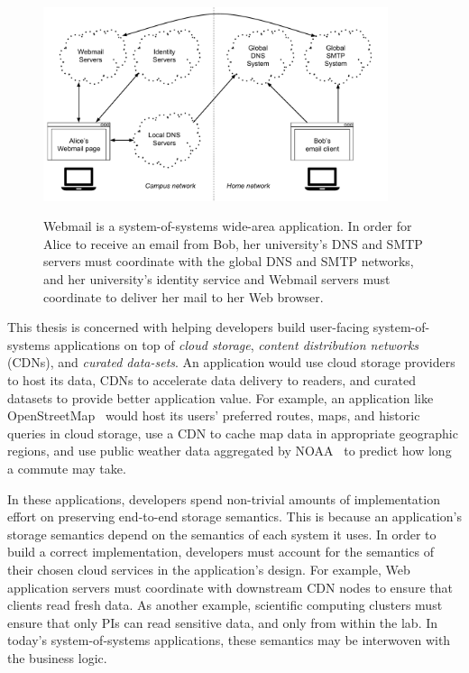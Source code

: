 \begin{figure}[h]
   \caption{Webmail is a system-of-systems wide-area application.  In order for
   Alice to receive an email from Bob, her university's DNS and SMTP servers
   must coordinate with the global DNS and SMTP networks, and her university's
   identity service and Webmail servers must coordinate to deliver her mail to
   her Web browser.}
   \centering
   \includegraphics[width=0.9\textwidth,page=1]{figures/dissertation-figures}
   \label{fig:chap1-system-of-systems}
\end{figure}

This thesis is concerned with helping developers build user-facing
system-of-systems applications on top of \emph{cloud storage},
\emph{content distribution networks} (CDNs), and \emph{curated data-sets}.
An application would use cloud storage providers to host
its data, CDNs to accelerate data delivery to readers,
and curated datasets to provide better application value.
For example, an application like OpenStreetMap~\cite{openstreetmap}
would host its users' preferred routes, maps, and historic queries in cloud storage,
use a CDN to cache map data in appropriate geographic regions,
and use public weather data aggregated by NOAA~\cite{noaa} to predict how long a commute may take.

In these applications, developers spend non-trivial amounts of implementation effort
on preserving end-to-end storage semantics.  This is because an application's
storage semantics depend on the semantics of each system it uses.  
In order to build a correct implementation, developers must account for
the semantics of their chosen cloud services in the application's design.
For example, Web application servers must coordinate with downstream CDN nodes to ensure that
clients read fresh data.  As another example, scientific computing clusters
must ensure that only PIs can read sensitive data, and only from within the lab.
In today's system-of-systems applications, these semantics may be interwoven
with the business logic.

